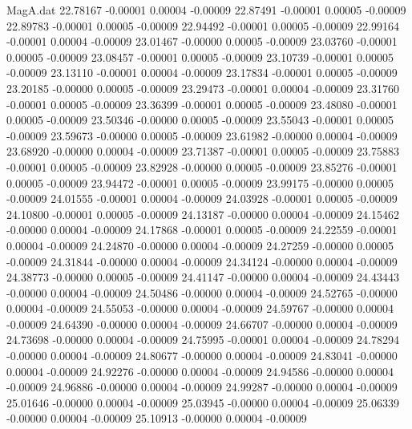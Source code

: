 \begin{filecontents}{MagA.dat}
  22.78167   -0.00001    0.00004   -0.00009
  22.87491   -0.00001    0.00005   -0.00009
  22.89783   -0.00001    0.00005   -0.00009
  22.94492   -0.00001    0.00005   -0.00009
  22.99164   -0.00001    0.00004   -0.00009
  23.01467   -0.00000    0.00005   -0.00009
  23.03760   -0.00001    0.00005   -0.00009
  23.08457   -0.00001    0.00005   -0.00009
  23.10739   -0.00001    0.00005   -0.00009
  23.13110   -0.00001    0.00004   -0.00009
  23.17834   -0.00001    0.00005   -0.00009
  23.20185   -0.00000    0.00005   -0.00009
  23.29473   -0.00001    0.00004   -0.00009
  23.31760   -0.00001    0.00005   -0.00009
  23.36399   -0.00001    0.00005   -0.00009
  23.48080   -0.00001    0.00005   -0.00009
  23.50346   -0.00000    0.00005   -0.00009
  23.55043   -0.00001    0.00005   -0.00009
  23.59673   -0.00000    0.00005   -0.00009
  23.61982   -0.00000    0.00004   -0.00009
  23.68920   -0.00000    0.00004   -0.00009
  23.71387   -0.00001    0.00005   -0.00009
  23.75883   -0.00001    0.00005   -0.00009
  23.82928   -0.00000    0.00005   -0.00009
  23.85276   -0.00001    0.00005   -0.00009
  23.94472   -0.00001    0.00005   -0.00009
  23.99175   -0.00000    0.00005   -0.00009
  24.01555   -0.00001    0.00004   -0.00009
  24.03928   -0.00001    0.00005   -0.00009
  24.10800   -0.00001    0.00005   -0.00009
  24.13187   -0.00000    0.00004   -0.00009
  24.15462   -0.00000    0.00004   -0.00009
  24.17868   -0.00001    0.00005   -0.00009
  24.22559   -0.00001    0.00004   -0.00009
  24.24870   -0.00000    0.00004   -0.00009
  24.27259   -0.00000    0.00005   -0.00009
  24.31844   -0.00000    0.00004   -0.00009
  24.34124   -0.00000    0.00004   -0.00009
  24.38773   -0.00000    0.00005   -0.00009
  24.41147   -0.00000    0.00004   -0.00009
  24.43443   -0.00000    0.00004   -0.00009
  24.50486   -0.00000    0.00004   -0.00009
  24.52765   -0.00000    0.00004   -0.00009
  24.55053   -0.00000    0.00004   -0.00009
  24.59767   -0.00000    0.00004   -0.00009
  24.64390   -0.00000    0.00004   -0.00009
  24.66707   -0.00000    0.00004   -0.00009
  24.73698   -0.00000    0.00004   -0.00009
  24.75995   -0.00001    0.00004   -0.00009
  24.78294   -0.00000    0.00004   -0.00009
  24.80677   -0.00000    0.00004   -0.00009
  24.83041   -0.00000    0.00004   -0.00009
  24.92276   -0.00000    0.00004   -0.00009
  24.94586   -0.00000    0.00004   -0.00009
  24.96886   -0.00000    0.00004   -0.00009
  24.99287   -0.00000    0.00004   -0.00009
  25.01646   -0.00000    0.00004   -0.00009
  25.03945   -0.00000    0.00004   -0.00009
  25.06339   -0.00000    0.00004   -0.00009
  25.10913   -0.00000    0.00004   -0.00009

\end{filecontents}
